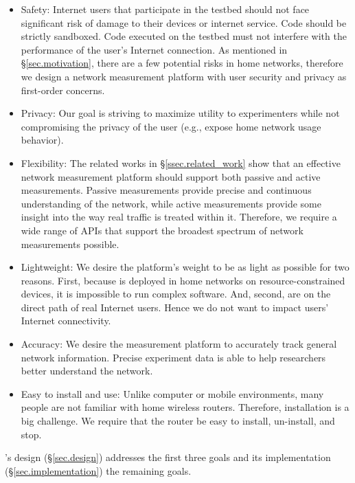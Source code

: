 \begin{itemize}
\item Safety: Internet users that participate in the testbed should not face significant risk of damage to their devices or internet service. Code should be strictly sandboxed. Code executed on the testbed must not interfere with the performance of the user's Internet connection. As mentioned in \S{\ref{sec.motivation}}, there are a few potential risks in home networks, therefore we design a network measurement platform with user security and privacy as first-order concerns.

\item Privacy: Our goal is striving to maximize utility to experimenters while not compromising the privacy of the user (e.g., expose home network usage behavior).

\item Flexibility: The related works in \S{\ref{ssec.related_work}} show that an effective network measurement platform should support both passive and active measurements. Passive measurements provide precise and continuous understanding of the network, while active measurements provide some insight into the way real traffic is treated within it. Therefore, we require a wide range of APIs that support the broadest spectrum of network measurements possible.

\item Lightweight: We desire the platform's weight to be as light as possible for two reasons. First, because \sysname is deployed in home networks on resource-constrained devices, it is impossible to run complex software. And, second,  \sysname are on the direct path of real Internet users. Hence we do not want to impact users' Internet connectivity.

\item Accuracy: We desire the measurement platform to accurately track 
general network information. Precise experiment data is able to help researchers better understand the network.

\item Easy to install and use: Unlike computer or mobile environments, many people are not familiar with home wireless routers. Therefore, installation is a big challenge. We require that the router be easy to install, un-install, and stop.
\end{itemize}

\sysname's design (\S\ref{sec.design}) addresses the first three goals and its implementation (\S\ref{sec.implementation}) the remaining goals.